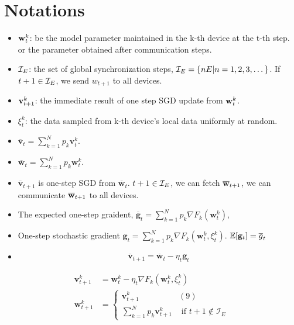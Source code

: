 
\section{Notations}

\begin{itemize}
	\item ${\mathbf{w}}_t^k$: be the model parameter maintained in the k-th device at the t-th step. or the parameter obtained after communication steps. 
	\item ${\mathcal{I}}_E$: the set of global synchronization steps, ${\mathcal{I}}_E = \{n E|n = 1, 2, 3,\dots \}$. If $t+1 \in {\mathcal{I}}_E$, we send $w_{t+1}$ to all devices.
	\item ${\mathbf{v}}^k_{t+1}$: the immediate result of one step SGD update from ${\mathbf{w}}^k_{t}$.
	\item $\xi_{t}^{k}$: the data sampled from k-th device’s local data 
	uniformly at random.
	\item $\overline{\mathbf{v}}_{t}=\sum_{k=1}^{N} p_{k} \mathbf{v}_{t}^{k}$.
	\item $\overline{\mathbf{w}}_{t}=\sum_{k=1}^{N} p_{k} \mathbf{w}_{t}^{k}$.
	\item $\overline{\mathbf{v}}_{t+1}$ is one-step SGD from $\overline{\mathbf{w}}_{t}$. $t+1 \in {\mathcal{I}}_E$, we can fetch $\overline{{\mathbf{w}}}_{t+1}$, we can communicate $\overline{{\mathbf{w}}}_{t+1}$ to all devices.
	\item The expected one-step graident, $\overline{\mathbf{g}}_{t}=\sum_{k=1}^{N} p_{k} \nabla F_{k}\left(\mathbf{w}_{t}^{k}\right)$,  
	\item One-step stochastic gradient $\mathbf{g}_{t}=\sum_{k=1}^{N} p_{k} \nabla F_{k}\left(\mathbf{w}_{t}^{k}, \xi_{t}^{k}\right)$. $\mathbb{E}[{\mathbf{g}}_t] = \overline{g}_t$
	\item 

	\begin{align}
	\overline{\mathbf{v}}_{t+1}=\overline{\mathbf{w}}_{t}-\eta_{t} \mathbf{g}_{t}	\label{eq:vbar}
	\end{align}

\end{itemize}

\begin{align} 
\mathbf{v}_{t+1}^{k} &=\mathbf{w}_{t}^{k}-\eta_{t} \nabla F_{k}\left(\mathbf{w}_{t}^{k}, \xi_{t}^{k}\right) \\ \mathbf{w}_{t+1}^{k} &=\left\{\begin{array}{ll}\mathbf{v}_{t+1}^{k} & (9) \\ \sum_{k=1}^{N} p_{k} \mathbf{v}_{t+1}^{k} & \text { if } t+1 \notin \mathcal{I}_{E}\end{array}\right.
\end{align}



